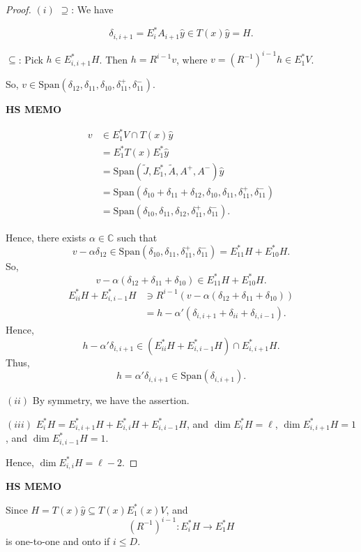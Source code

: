 \documentclass[
]{book}
\theoremstyle{definition}
\theoremstyle{definition}
\theoremstyle{definition}
\theoremstyle{definition}
\theoremstyle{remark}
\begin{document}
\begin{proof}
\leavevmode

\((i)\) \(\supseteq\): We have

\[\delta_{i,i+1} = E^*_iA_{i+1}\hat{y} \in T(x)\hat{y} = H.\]

\(\subseteq\): Pick \(h\in E^*_{i,i+1}H\). Then \(h = R^{i-1}v\), where \(v = (R^{-1})^{i-1}h\in E^*_1V\).

So, \(v\in \mathrm{Span}(\delta_{12}, \delta_{11}, \delta_{10}, \delta^+_{11}, \delta^-_{11})\).

\textbf{HS MEMO}

\begin{align}
v &\in E^*_1V \cap T(x)\hat{y}\\
& = E^*_1T(x)E^*_1\hat{y}\\
& = \mathrm{Span}(\tilde{J}, E^*_1, \tilde{A}, A^+, A^-)\hat{y}\\
& = \mathrm{Span}(\delta_{10}+ \delta_{11}+ \delta_{12}, \delta_{10}, \delta_{11}, \delta^+_{11}, \delta^-_{11})\\
& = \mathrm{Span}(\delta_{10}, \delta_{11},  \delta_{12}, \delta^+_{11}, \delta^-_{11}).
\end{align}

Hence, there exists \(\alpha \in \mathbb{C}\) such that
\[v-\alpha \delta_{12}  \in \mathrm{Span}(\delta_{10}, \delta_{11}, \delta^+_{11}, \delta^-_{11}) = E^*_{11}H + E^*_{10}H.\]
So,
\[v-\alpha(\delta_{12} + \delta_{11} + \delta_{10}) \in E^*_{11}H + E^*_{10}H.\]
\begin{align}
E^*_{ii}H + E^*_{i,i-1}H & \ni R^{i-1}(v-\alpha(\delta_{12}+\delta_{11}+\delta_{10}))\\
& = h - \alpha'(\delta_{i,i+1}+\delta_{ii}+\delta_{i,i-1}).
\end{align}
Hence,
\[h-\alpha'\delta_{i,i+1}\in (E^*_{ii}H + E^*_{i,i-1}H)\cap E^*_{i,i+1}H.\]
Thus,
\[h = \alpha'\delta_{i,i+1} \in \mathrm{Span}(\delta_{i,i+1}).\]

\((ii)\) By symmetry, we have the assertion.

\((iii)\) \(E^*_i H = E^*_{i,i+1}H + E^*_{i,i}H + E^*_{i,i-1}H\), and \(\dim E^*_iH = \ell\), \(\dim E^*_{i,i+1}H =1\), and \(\dim E^*_{i,i-1}H = 1\).

Hence, \(\dim E^*_{i,i}H = \ell -2\).

\end{proof}

\textbf{HS MEMO}

Since \(H = T(x)\hat{y} \subseteq T(x)E^*_{1}(x)V\), and
\[(R^{-1})^{i-1}: E^*_iH \to E^*_1H\]
is one-to-one and onto if \(i\leq D\).
\end{document}
